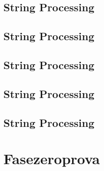 \raggedbottom
\vspace{-.7\baselineskip}\hrulefill
\vspace{0.1\baselineskip}\subsection{String Processing}
\raggedbottom
\vspace{-.7\baselineskip}\hrulefill
\vspace{0.1\baselineskip}\subsection{String Processing}
\raggedbottom
\vspace{-.7\baselineskip}\hrulefill
\vspace{0.1\baselineskip}\subsection{String Processing}
\raggedbottom
\vspace{-.7\baselineskip}\hrulefill
\vspace{0.1\baselineskip}\subsection{String Processing}
\raggedbottom
\vspace{-.7\baselineskip}\hrulefill
\vspace{0.1\baselineskip}\subsection{String Processing}
\raggedbottom
\vspace{-.7\baselineskip}\hrulefill
\vspace{0.1\baselineskip}
\section{Fasezeroprova}
